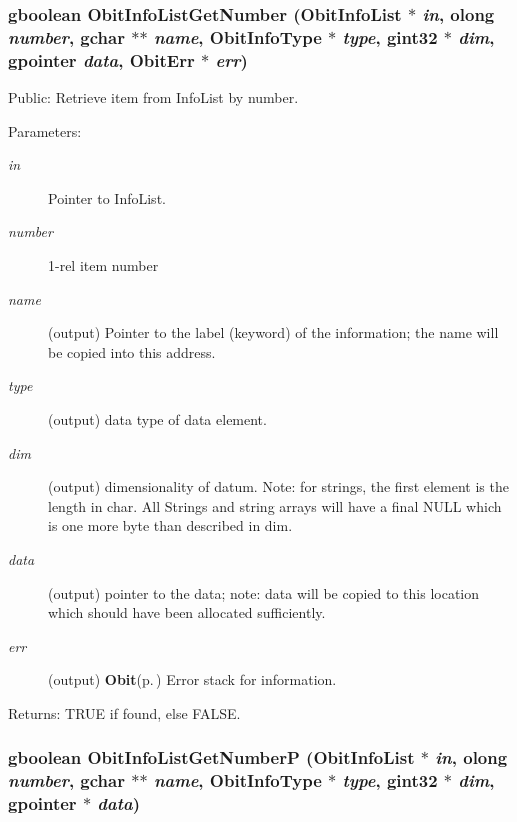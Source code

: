 \subsubsection{\setlength{\rightskip}{0pt plus 5cm}gboolean Obit\-Info\-List\-Get\-Number ({\bf Obit\-Info\-List} $\ast$ {\em in}, {\bf olong} {\em number}, gchar $\ast$$\ast$ {\em name}, Obit\-Info\-Type $\ast$ {\em type}, gint32 $\ast$ {\em dim}, gpointer {\em data}, {\bf Obit\-Err} $\ast$ {\em err})}\label{ObitInfoList_8h_a16}


Public: Retrieve item from Info\-List by number. 

\begin{Desc}
\item[Parameters:]
\begin{description}
\item[{\em in}]Pointer to Info\-List. \item[{\em number}]1-rel item number \item[{\em name}](output) Pointer to the label (keyword) of the information; the name will be copied into this address. \item[{\em type}](output) data type of data element. \item[{\em dim}](output) dimensionality of datum. Note: for strings, the first element is the length in char. All Strings and string arrays will have a final NULL which is one more byte than described in dim. \item[{\em data}](output) pointer to the data; note: data will be copied to this location which should have been allocated sufficiently. \item[{\em err}](output) {\bf Obit}{\rm (p.\,\pageref{structObit})} Error stack for information. \end{description}
\end{Desc}
\begin{Desc}
\item[Returns:]TRUE if found, else FALSE. \end{Desc}
\subsubsection{\setlength{\rightskip}{0pt plus 5cm}gboolean Obit\-Info\-List\-Get\-Number\-P ({\bf Obit\-Info\-List} $\ast$ {\em in}, {\bf olong} {\em number}, gchar $\ast$$\ast$ {\em name}, Obit\-Info\-Type $\ast$ {\em type}, gint32 $\ast$ {\em dim}, gpointer $\ast$ {\em data})}\label{ObitInfoList_8h_a17}


